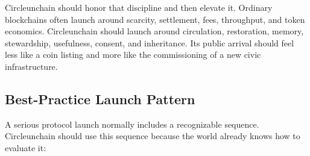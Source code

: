 \documentclass[12pt]{article}
\begin{document}
Circleunchain should honor that discipline and then elevate it. Ordinary blockchains often launch around scarcity, settlement, fees, throughput, and token economics. Circleunchain should launch around circulation, restoration, memory, stewardship, usefulness, consent, and inheritance. Its public arrival should feel less like a coin listing and more like the commissioning of a new civic infrastructure.



\subsection{Best-Practice Launch Pattern}

A serious protocol launch normally includes a recognizable sequence. Circleunchain should use this sequence because the world already knows how to evaluate it:
\end{document}
